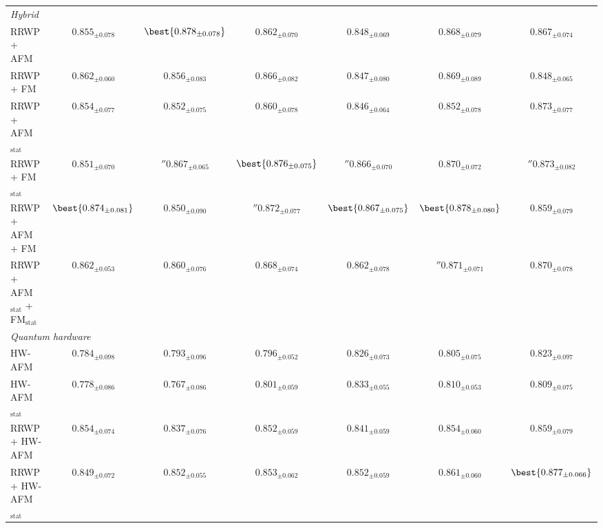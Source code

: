 \begin{table}
{\begin{tabular}{l c c c c c c}
\midrule
\multicolumn{7}{l}{\textit{Hybrid}} \\
  RRWP + AFM & $0.855{_{\pm 0.078}}$ & $\best{0.878{_{\pm 0.078}}}$ & $0.862{_{\pm 0.070}}$ & $0.848{_{\pm 0.069}}$ & $0.868{_{\pm 0.079}}$ & $0.867{_{\pm 0.074}}$ \\
  RRWP + FM & $0.862{_{\pm 0.060}}$ & $0.856{_{\pm 0.083}}$ & $0.866{_{\pm 0.082}}$ & $0.847{_{\pm 0.080}}$ & $0.869{_{\pm 0.089}}$ & $0.848{_{\pm 0.065}}$ \\
  RRWP + AFM$_{\text{stat}}$ & $0.854{_{\pm 0.077}}$ & $0.852{_{\pm 0.075}}$ & $0.860{_{\pm 0.078}}$ & $0.846{_{\pm 0.064}}$ & $0.852{_{\pm 0.078}}$ & $0.873{_{\pm 0.077}}$ \\
  RRWP + FM$_{\text{stat}}$ & $0.851{_{\pm 0.070}}$ & $\second{0.867}{_{\pm 0.065}}$ & $\best{0.876{_{\pm 0.075}}}$ & $\second{0.866}{_{\pm 0.070}}$ & $0.870{_{\pm 0.072}}$ & $\second{0.873}{_{\pm 0.082}}$ \\
  RRWP + AFM + FM & $\best{0.874{_{\pm 0.081}}}$ & $0.850{_{\pm 0.090}}$ & $\second{0.872}{_{\pm 0.077}}$ & $\best{0.867{_{\pm 0.075}}}$ & $\best{0.878{_{\pm 0.080}}}$ & $0.859{_{\pm 0.079}}$ \\
  RRWP + AFM$_{\text{stat}}$ + FM$_{\text{stat}}$ & $0.862{_{\pm 0.053}}$ & $0.860{_{\pm 0.076}}$ & $0.868{_{\pm 0.074}}$ & $0.862{_{\pm 0.078}}$ & $\second{0.871}{_{\pm 0.071}}$ & $0.870{_{\pm 0.078}}$ \\
\midrule
\multicolumn{7}{l}{\textit{Quantum hardware}} \\
  HW-AFM & $0.784{_{\pm 0.098}}$ & $0.793{_{\pm 0.096}}$ & $0.796{_{\pm 0.052}}$ & $0.826{_{\pm 0.073}}$ & $0.805{_{\pm 0.075}}$ & $0.823{_{\pm 0.097}}$ \\
  HW-AFM$_{\text{stat}}$ & $0.778{_{\pm 0.086}}$ & $0.767{_{\pm 0.086}}$ & $0.801{_{\pm 0.059}}$ & $0.833{_{\pm 0.055}}$ & $0.810{_{\pm 0.053}}$ & $0.809{_{\pm 0.075}}$ \\
  RRWP + HW-AFM & $0.854{_{\pm 0.074}}$ & $0.837{_{\pm 0.076}}$ & $0.852{_{\pm 0.059}}$ & $0.841{_{\pm 0.059}}$ & $0.854{_{\pm 0.060}}$ & $0.859{_{\pm 0.079}}$ \\
  RRWP + HW-AFM$_{\text{stat}}$ & $0.849{_{\pm 0.072}}$ & $0.852{_{\pm 0.055}}$ & $0.853{_{\pm 0.062}}$ & $0.852{_{\pm 0.059}}$ & $0.861{_{\pm 0.060}}$ & $\best{0.877{_{\pm 0.066}}}$ \\
\bottomrule
\end{tabular}
}
\end{table}
